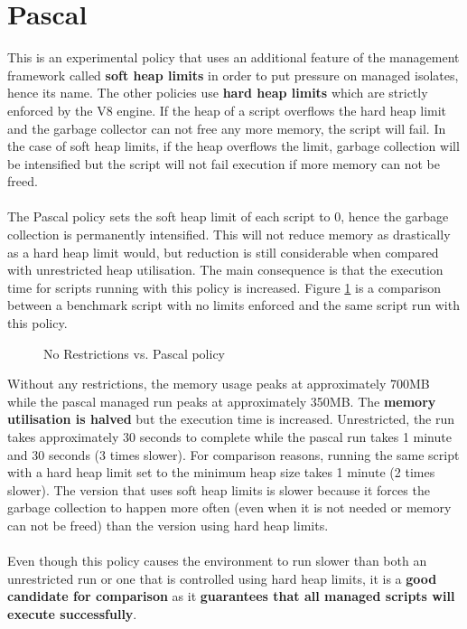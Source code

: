 \documentclass{l4proj}
\begin{document}
\section{Pascal}
\hspace*{1em} This is an experimental policy that uses an additional feature of the management framework called \textbf{soft heap limits} in order to put pressure on managed isolates, hence its name. The other policies use \textbf{hard heap limits} which are strictly enforced by the V8 engine. If the heap of a script overflows the hard heap limit and the garbage collector can not free any more memory, the script will fail. In the case of soft heap limits, if the heap overflows the limit, garbage collection will be intensified but the script will not fail execution if more memory can not be freed.
\\\\
\hspace*{1em} The Pascal policy sets the soft heap limit of each script to 0, hence the garbage collection is permanently intensified. This will not reduce memory as drastically as a hard heap limit would, but reduction is still considerable when compared with unrestricted heap utilisation. The main consequence is that the execution time for scripts running with this policy is increased. Figure \ref{pascal} is a comparison between a benchmark script with no limits enforced and the same script run with this policy.

\begin{figure}[!ht]
\centering
{}
\caption{No Restrictions vs. Pascal policy}
\label{pascal}
\end{figure}

\hspace*{1em} Without any restrictions, the memory usage peaks at approximately 700MB while the pascal managed run peaks at approximately 350MB. The \textbf{memory utilisation is halved} but the execution time is increased. Unrestricted, the run takes approximately 30 seconds to complete while the pascal run takes 1 minute and 30 seconds (3 times slower). For comparison reasons, running the same script with a hard heap limit set to the minimum heap size takes 1 minute (2 times slower). The version that uses soft heap limits is slower because it forces the garbage collection to happen more often (even when it is not needed or memory can not be freed) than the version using hard heap limits.
\\\\
\hspace*{1em} Even though this policy causes the environment to run slower than both an unrestricted run or one that is controlled using hard heap limits, it is a \textbf{good candidate for comparison} as it \textbf{guarantees that all managed scripts will execute successfully}.
\end{document}
